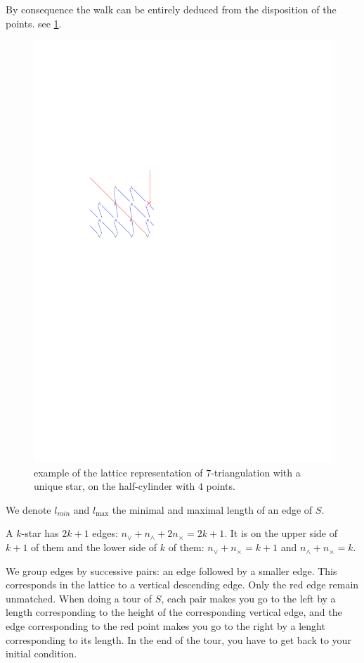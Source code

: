 \documentclass{amsart}
\theoremstyle{remark}
\begin{document}
By consequence the walk can be entirely deduced from the disposition of the points. see \cref{fig:exLattice}.

\begin{figure}\label{fig:exLattice}
\includegraphics[width=.98\linewidth]{latticeRepresentation}
\caption{example of the lattice representation of $7$-triangulation with a unique star, on the half-cylinder with $4$ points.}
\end{figure}

We denote $l_{min}$ and $l_{\max}$ the minimal and maximal length of an edge of $S$.

A $k$-star has $2k+1$ edges: $n_\vee+n_\wedge+2n_\times=2k+1$. It is on the upper side of $k+1$ of them and the lower side of $k$ of them: $n_\vee+n_\times=k+1$ and $n_\wedge+n_\times=k$.

We group edges by successive pairs: an edge followed by a smaller edge. This corresponds in the lattice to a vertical descending edge. Only the red edge remain unmatched. When doing a tour of $S$, each pair makes you go to the left by a length corresponding to the height of the corresponding vertical edge, and the edge corresponding to the red point makes you go to the right by a lenght corresponding to its length. In the end of the tour, you have to get back to your initial condition.
\end{document}
